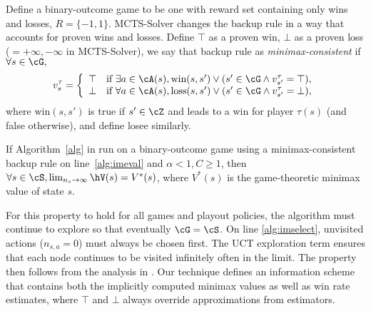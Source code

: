 Define a binary-outcome game to be one with reward set containing only wins and losses, $R = \{ -1, 1 \}$. 
MCTS-Solver changes the backup rule in a way that accounts for proven wins and losses.  
Define $\top$ as a proven win, $\bot$ as a proven loss ($= +\infty, -\infty$ in MCTS-Solver), 
we say that backup rule as {\it minimax-consistent} 
if $\forall s \in \cG,$
\[ 
v^{\tau}_s = \left\{ \begin{array}{ll}
\top & \mbox{if } \exists a \in \cA(s), \mbox{win}(s, s') \vee (s' \in \cG \wedge v^{\tau}_{s'} = \top), \\
\bot & \mbox{if } \forall a \in \cA(s), \mbox{loss}(s, s') \vee (s' \in \cG \wedge v^{\tau}_{s'} = \bot), \end{array} \right. 
\]
where $\mbox{win}(s,s')$ is true if $s' \in \cZ$ and leads to a win for player $\tau(s)$ (and false otherwise), 
and define losee similarly.

\begin{proposition}
If Algorithm~\ref{alg} in run on a binary-outcome game  
using a minimax-consistent backup rule on line~\ref{alg:imeval} and $\alpha<1,C\ge1$, then
$\forall s \in \cS, \lim_{n_s \rightarrow \infty} \hV(s) = V^*(s)$, where $V^*(s)$ is the 
game-theoretic minimax value of state $s$.  
\end{proposition}

For this property to hold for all games and playout policies, 
the algorithm must continue to explore so that eventually $\cG = \cS$. 
On line \ref{alg:imselect}, unvisited actions ($n_{s,a} = 0$) must always be chosen first.  
The UCT exploration term ensures that each node continues to be visited infinitely often 
in the limit. 
The property then follows from the analysis in \cite[Section 2.3]{Saffidine13PhdThesis}. 
Our technique defines an information scheme that contains both the implicitly computed 
minimax values as well as win rate estimates, where $\top$ and $\bot$ always override 
approximations from estimators. 

